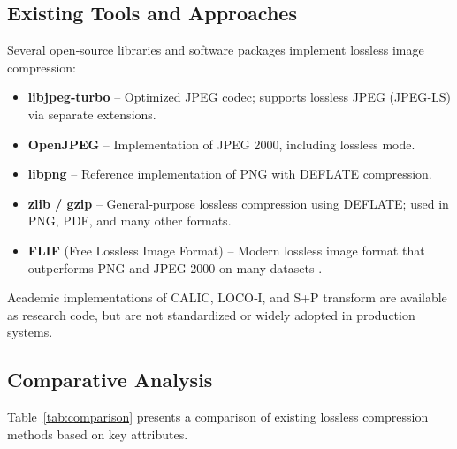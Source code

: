 \subsection{Existing Tools and Approaches}

Several open‑source libraries and software packages implement lossless image compression:

\begin{itemize}
    \item \textbf{libjpeg‑turbo} – Optimized JPEG codec; supports lossless JPEG (JPEG‑LS) via separate extensions.
    \item \textbf{OpenJPEG} – Implementation of JPEG 2000, including lossless mode.
    \item \textbf{libpng} – Reference implementation of PNG with DEFLATE compression.
    \item \textbf{zlib / gzip} – General‑purpose lossless compression using DEFLATE; used in PNG, PDF, and many other formats.
    \item \textbf{FLIF} (Free Lossless Image Format) – Modern lossless image format that outperforms PNG and JPEG 2000 on many datasets \cite{Salomon1997}.
\end{itemize}

Academic implementations of CALIC, LOCO‑I, and S+P transform are available as research code, but are not standardized or widely adopted in production systems.

\subsection{Comparative Analysis}

Table~\ref{tab:comparison} presents a comparison of existing lossless compression methods based on key attributes.

